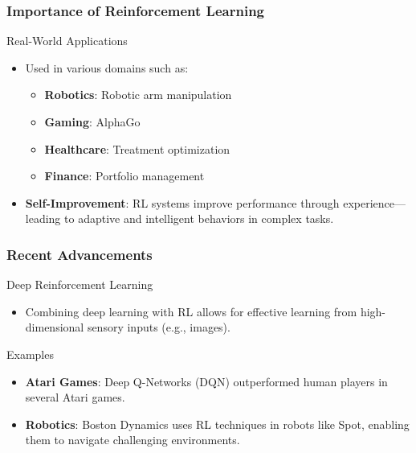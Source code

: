 \documentclass[aspectratio=169]{beamer}
\begin{document}
\begin{frame}[fragile]
    \frametitle{Importance of Reinforcement Learning}
    \begin{block}{Real-World Applications}
        \begin{itemize}
            \item Used in various domains such as:
            \begin{itemize}
                \item \textbf{Robotics}: Robotic arm manipulation
                \item \textbf{Gaming}: AlphaGo
                \item \textbf{Healthcare}: Treatment optimization
                \item \textbf{Finance}: Portfolio management
            \end{itemize}
            \item \textbf{Self-Improvement}: RL systems improve performance through experience—leading to adaptive and intelligent behaviors in complex tasks.
        \end{itemize}
    \end{block}
\end{frame}

\begin{frame}[fragile]
    \frametitle{Recent Advancements}
    \begin{block}{Deep Reinforcement Learning}
        \begin{itemize}
            \item Combining deep learning with RL allows for effective learning from high-dimensional sensory inputs (e.g., images).
        \end{itemize}
    \end{block}
    
    \begin{block}{Examples}
        \begin{itemize}
            \item \textbf{Atari Games}: Deep Q-Networks (DQN) outperformed human players in several Atari games.
            \item \textbf{Robotics}: Boston Dynamics uses RL techniques in robots like Spot, enabling them to navigate challenging environments.
        \end{itemize}
    \end{block}
\end{frame}
\end{document}
